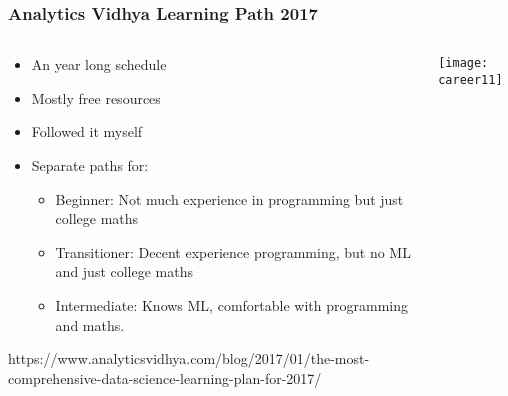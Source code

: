 



\begin{frame}[fragile]\frametitle{Analytics Vidhya Learning Path 2017}
\begin{columns}
    \begin{column}[T]{0.5\linewidth}
      \begin{itemize}
			\item An year long schedule
			\item Mostly free resources
			\item Followed it myself
			\item Separate paths for:
			      \begin{itemize}

						\item Beginner: Not much experience in programming but just college maths
						\item Transitioner: Decent experience programming, but no ML and just college maths
						\item Intermediate: Knows ML, comfortable with programming and maths.
						\end{itemize}
			\end{itemize}
				https://www.analyticsvidhya.com/blog/2017/01/the-most-comprehensive-data-science-learning-plan-for-2017/

		\end{column}
    \begin{column}[T]{0.5\linewidth}
		
	\begin{center}
	\texttt{[image: career11]}
	\end{center}
    \end{column}
  \end{columns}
	

	
\end{frame}


